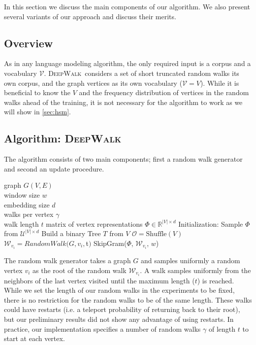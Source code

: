\documentclass{sig-alternate}
\newcommand{\ouralgorithm}{\textsc{DeepWalk}}
\begin{document}
In this section we discuss the main components of our algorithm. 
We also present several variants of our approach and discuss their merits.

\subsection{Overview}
As in any language modeling algorithm, the only required input is a corpus and a vocabulary $\mathcal{V}$.
\ouralgorithm\  considers a set of short truncated random walks its own corpus, and the graph vertices as its own vocabulary ($\mathcal{V} = V$).
While it is beneficial to know the $V$ and the frequency distribution of vertices in the random walks ahead of the training, it is not necessary for the algorithm to work as we will show in \ref{sec:hsm}.

\subsection{Algorithm: {\large \ouralgorithm}}
The algorithm consists of two main components; first a random walk generator and second an update procedure.

\begin{algorithm}[t]
\begin{algorithmic}[1]
\REQUIRE graph $G(V,E)$\\ window size $w$\\ embedding size $d$\\ walks per vertex $\mathcal{\gamma}$ \\ walk length $t$
\ENSURE matrix of vertex representations $\Phi \in \mathbb{R}^{|V| \times d}$
	\STATE Initialization: Sample $\Phi$ from $\mathcal{U}^{|V| \times d}$
	\STATE Build a binary Tree $T$ from $V$
		\STATE	$\mathcal{O} = \text{Shuffle}(V)$
		\STATE $\mathcal{W}_{v_i} = RandomWalk(G, v_i, $t$) $
		\STATE SkipGram($\Phi$, $\mathcal{W}_{v_i}$, $w$)
		 \ENDFOR
	\ENDFOR
\end{algorithmic}
\caption{\ouralgorithm($G$, $w$, $d$, $\gamma$, $t$)}
\label{alg:deepwalk}
\end{algorithm}

The random walk generator takes a graph $G$ and samples uniformly a random vertex $v_i$ as the root of the random walk $\mathcal{W}_{v_i}$.
A walk samples uniformly from the neighbors of the last vertex visited until the maximum length ($t$) is reached.
While we set the length of our random walks in the experiments to be fixed, there is no restriction for the random walks to be of the same length.
These walks could have restarts (i.e. a teleport probability of returning back to their root), but
our preliminary results did not show any advantage of using restarts.
In practice, our implementation specifies a number of random walks $\mathcal{\gamma}$ of length $t$ to start at each vertex.
\end{document}
